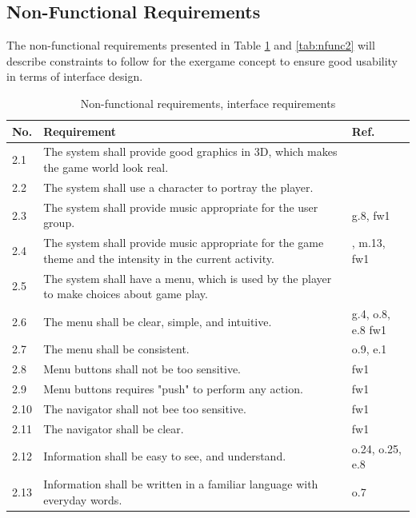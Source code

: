 \subsection{Non-Functional Requirements}
The non-functional requirements presented in Table \ref{tab:nfunc1} and \ref{tab:nfunc2} will describe constraints to follow for the exergame concept to ensure good usability in terms of interface design.

\begin{table} [H]
\centering
\begin{tabular}{|>{\raggedright}p{}|p{}|p{}|} 
\hline
\textbf{No.} & \textbf{Requirement} & \textbf{Ref.} \\ \hline
2.1 & The system shall provide good graphics in 3D, which makes the game world look real. & \cite{understandingvg} \cite{john2012smartsenior}\\ \hline
2.2 & The system shall use a character to portray the player. & \cite{understandingvg} \cite{john2012smartsenior}\\ \hline
2.3 & The system shall provide music appropriate for the user group. & g.8, fw1 \\ \hline
2.4 & The system shall provide music appropriate for the game theme and the intensity in the current activity. & \cite{umlapproach}, m.13, fw1 \\ \hline
2.5 & The system shall have a menu, which is used by the player to make choices about game play. & \cite{gerling2} \cite{john2012smartsenior}\\ \hline
2.6 & The menu shall be clear, simple, and intuitive. & \cite{sweetser} g.4, o.8, e.8 fw1 \\ \hline
2.7 & The menu shall be consistent. & o.9, e.1 \\ \hline
2.8 & Menu buttons shall not be too sensitive. & fw1 \\ \hline
2.9 & Menu buttons requires "push" to perform any action. &  fw1\\ \hline
2.10 & The navigator shall not bee too sensitive. & fw1\\ \hline
2.11 & The navigator shall be clear. &  fw1\\ \hline
2.12 & Information shall be easy to see, and understand. & o.24, o.25, e.8\\ \hline
2.13 & Information shall be written in a familiar language with everyday words. & o.7\\ \hline
\end{tabular}
\caption[Non-functional requirements, part 1]{Non-functional requirements, interface requirements}
\label{tab:nfunc1}
\end{table} 
